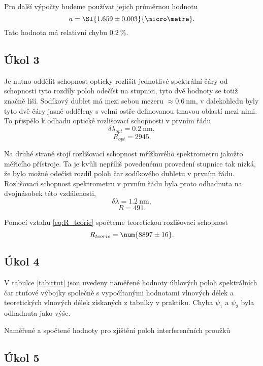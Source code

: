 \documentclass{protokol}
\begin{document}
      Pro další výpočty budeme používat jejich průměrnou hodnotu
      $$ a = \SI{1.659 \pm 0.003}{\micro\metre}. $$
      Tato hodnota má relativní chybu $\SI{0.2}{\percent}$.

    \subsection*{Úkol 3}

      Je nutno oddělit schopnost opticky rozlišit jednotlivé spektrální čáry od schopnosti tyto rozdíly poloh odečíst na stupnici, tyto dvě hodnoty se totiž značně liší. Sodíkový dublet má mezi sebou mezeru $\approx \SI{0.6}{\nano\metre}$, v dalekohledu byly tyto dvě čáry jasně odděleny s velmi ostře definovanou tmavou oblastí mezi nimi. To přispělo k odhadu optické rozlišovací schopnosti v prvním řádu
      $$ \delta \lambda_{opt} = \SI{0.2}{\nano\metre}, $$
      $$ R_{opt} = \num{2945}. $$ 

      Na druhé straně stojí rozlišovací schopnost mřížkového spektrometru jakožto měřicího přístroje. Ta je kvůli nepříliš povedenému provedení stupnice tak nízká, že bylo možné odečíst rozdíl poloh čar sodíkového dubletu v prvním řádu. Rozlišovací schopnost spektrometru v prvním řádu byla proto odhadnuta na dvojnásobek této vzdálenosti,
      $$ \delta \lambda = \SI{1.2}{\nano\metre}, $$
      $$ R = \num{491}. $$

      Pomocí vztahu \eqref{eq:R_teorie} spočteme teoretickou rozlišovací schopnost 
      $$ R_{teorie} = \num{8897 \pm 16}. $$

    \subsection*{Úkol 4}

      V tabulce \ref{tab:rtut} jsou uvedeny naměřené hodnoty úhlových poloh spektrálních čar rtuťové výbojky společně s vypočítanými hodnotami vlnových délek a teoretických vlnových délek získaných z tabulky v praktiku. Chyba $\psi_1$ a $\psi_2$ byla odhadnuta jako výše.
      
      \begin{table}[H]
        \centering
        \setlength{\tabcolsep}{10pt}
        
        \caption{Naměřené a spočtené hodnoty pro zjištění poloh interferenčních proužků}
        \label{tab:rtut}
      \end{table}

    \subsection*{Úkol 5}
\end{document}
